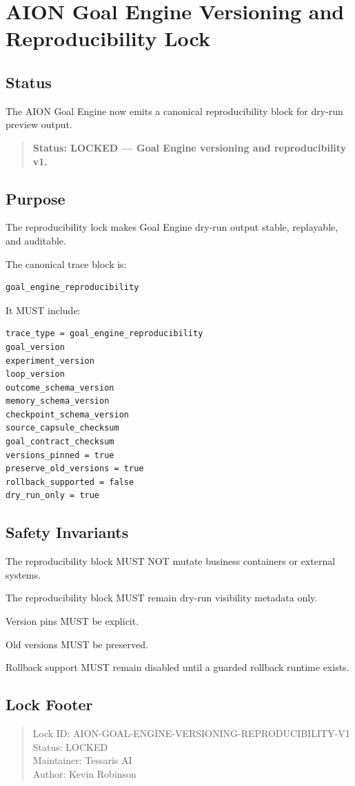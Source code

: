 \section{AION Goal Engine Versioning and Reproducibility Lock}
\label{sec:aion-goal-engine-versioning-reproducibility-lock}

\subsection{Status}

The AION Goal Engine now emits a canonical reproducibility block for dry-run preview output.

\begin{quote}
\textbf{Status: LOCKED --- Goal Engine versioning and reproducibility v1.}
\end{quote}

\subsection{Purpose}

The reproducibility lock makes Goal Engine dry-run output stable, replayable, and auditable.

The canonical trace block is:

\begin{verbatim}
goal_engine_reproducibility
\end{verbatim}

It MUST include:

\begin{verbatim}
trace_type = goal_engine_reproducibility
goal_version
experiment_version
loop_version
outcome_schema_version
memory_schema_version
checkpoint_schema_version
source_capsule_checksum
goal_contract_checksum
versions_pinned = true
preserve_old_versions = true
rollback_supported = false
dry_run_only = true
\end{verbatim}

\subsection{Safety Invariants}

The reproducibility block MUST NOT mutate business containers or external systems.

The reproducibility block MUST remain dry-run visibility metadata only.

Version pins MUST be explicit.

Old versions MUST be preserved.

Rollback support MUST remain disabled until a guarded rollback runtime exists.

\subsection{Lock Footer}

\begin{quote}
Lock ID: AION-GOAL-ENGINE-VERSIONING-REPRODUCIBILITY-V1\\
Status: LOCKED\\
Maintainer: Tessaris AI\\
Author: Kevin Robinson
\end{quote}
